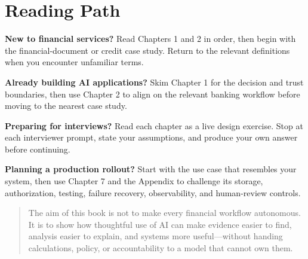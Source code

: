 \section*{Reading Path}

\textbf{New to financial services?} Read Chapters 1 and 2 in order, then begin with the financial-document or credit case study. Return to the relevant definitions when you encounter unfamiliar terms.

\textbf{Already building AI applications?} Skim Chapter 1 for the decision and trust boundaries, then use Chapter 2 to align on the relevant banking workflow before moving to the nearest case study.

\textbf{Preparing for interviews?} Read each chapter as a live design exercise. Stop at each interviewer prompt, state your assumptions, and produce your own answer before continuing.

\textbf{Planning a production rollout?} Start with the use case that resembles your system, then use Chapter 7 and the Appendix to challenge its storage, authorization, testing, failure recovery, observability, and human-review controls.

\begin{quote}
The aim of this book is not to make every financial workflow autonomous. It is to show how thoughtful use of AI can make evidence easier to find, analysis easier to explain, and systems more useful---without handing calculations, policy, or accountability to a model that cannot own them.
\end{quote}
